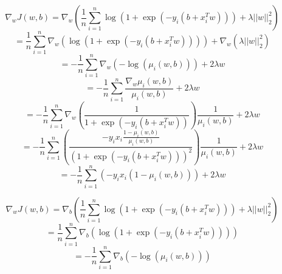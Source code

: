 \documentclass{article}
\begin{document}
\begin{aprob}
\begin{enumerate}
        \begin{equation*}
        \nabla_w J(w,b) = \nabla_w \left( \frac{1}{n} \sum_{i=1}^n \log( 1 + \exp(-y_i (b + x_i^T w))) + \lambda ||w||_2^2 \right)
        \end{equation*}
        \begin{equation*}
        = \frac{1}{n} \sum_{i=1}^n \nabla_w \left( \log( 1 + \exp(-y_i (b + x_i^T w))) \right) + \nabla_w \left( \lambda ||w||_2^2  \right)
        \end{equation*}
        \begin{equation*}
        = -\frac{1}{n} \sum_{i=1}^n \nabla_w \left( -\log( \mu_i(w,b)) \right) + 2 \lambda w
        \end{equation*}
        \begin{equation*}
        = -\frac{1}{n} \sum_{i=1}^n \frac{\nabla_w \mu_i(w,b)}{\mu_i(w,b)} + 2 \lambda w
        \end{equation*}
        \begin{equation*}
        = -\frac{1}{n} \sum_{i=1}^n \nabla_w \left( \frac{1}{1 + \exp(-y_i (b + x_i^T w))} \right) \frac{1}{\mu_i(w,b)} + 2 \lambda w
        \end{equation*}
        \begin{equation*}
        = -\frac{1}{n} \sum_{i=1}^n \left( \frac{-y_i x_i \frac{1 - \mu_i(w,b)}{\mu_i(w,b)}}{(1 + \exp(-y_i (b + x_i^T w)))^2} \right) \frac{1}{\mu_i(w,b)} + 2 \lambda w
        \end{equation*}
        \begin{equation*}
        = -\frac{1}{n} \sum_{i=1}^n (-y_i x_i (1- \mu_i(w,b))) + 2 \lambda w
        \end{equation*}
        
        \begin{equation*}
        \nabla_w J(w,b) = \nabla_b \left( \frac{1}{n} \sum_{i=1}^n \log( 1 + \exp(-y_i (b + x_i^T w))) + \lambda ||w||_2^2 \right)
        \end{equation*}
        \begin{equation*}
        = \frac{1}{n} \sum_{i=1}^n \nabla_b \left( \log( 1 + \exp(-y_i (b + x_i^T w))) \right)
        \end{equation*}
        \begin{equation*}
        = -\frac{1}{n} \sum_{i=1}^n \nabla_b \left( -\log( \mu_i(w,b)) \right)
        \end{equation*}
        

\end{enumerate}
\end{aprob}
\end{document}
